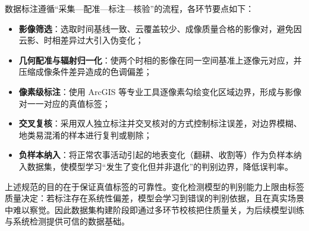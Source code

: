 数据标注遵循“采集—配准—标注—核验”的流程，各环节要点如下：

\begin{itemize}
    \item \textbf{影像筛选}：选取时间基线一致、云覆盖较少、成像质量合格的影像对，避免因云影、时相差异过大引入伪变化；
    \item \textbf{几何配准与辐射归一化}：使两个时相的影像在同一空间基准上逐像元对应，并压缩成像条件差异造成的色调偏差；
    \item \textbf{像素级标注}：使用 ArcGIS 等专业工具逐像素勾绘变化区域边界，形成与影像对一一对应的真值标签；
    \item \textbf{交叉复核}：采用双人独立标注并交叉核对的方式控制标注误差，对边界模糊、地类易混淆的样本进行复判或剔除；
    \item \textbf{负样本纳入}：将正常农事活动引起的地表变化（翻耕、收割等）作为负样本纳入数据集，使模型学习“发生了变化但并非退化”的判别边界，降低误判率。
\end{itemize}

上述规范的目的在于保证真值标签的可靠性。变化检测模型的判别能力上限由标签质量决定：若标注存在系统性偏差，模型会学习到错误的判别依据，且在真实场景中难以察觉。因此数据集构建阶段即通过多环节校核把住质量关，为后续模型训练与系统检测提供可信的数据基础。
